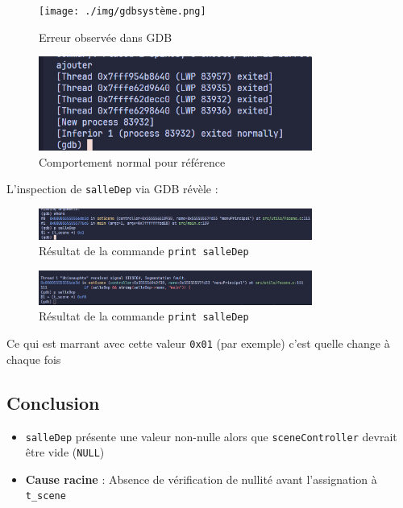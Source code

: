 \documentclass[a4paper,11pt]{article}
\begin{document}
\begin{figure}[h]
    \centering
    \texttt{[image: ./img/gdbsystème.png]}
    \caption{Erreur observée dans GDB}
    \label{fig:gdb_error}
\end{figure}

\begin{figure}[h]
    \centering
    \includegraphics[width=0.8\textwidth]{./img/ExempleMarcheBien.png}
    \caption{Comportement normal pour référence}
    \label{fig:working_example}
\end{figure}

L'inspection de \texttt{salleDep} via GDB révèle :

\begin{figure}[h]
    \centering
    \includegraphics[width=0.8\textwidth]{./img/ErreurAvecPrint.png}
    \caption{Résultat de la commande \texttt{print salleDep}}
    \label{fig:gdb_print}
\end{figure}

\begin{figure}[h]
  \centering
  \includegraphics[width=0.8\textwidth]{./img/Erreur2.png}
  \caption{Résultat de la commande \texttt{print salleDep}}
  \label{fig:gdb_print2}
\end{figure}

Ce qui est marrant avec cette valeur \texttt{0x01} (par exemple) c'est quelle change à chaque fois

\subsection*{Conclusion}
\begin{itemize}
    \item \texttt{salleDep} présente une valeur non-nulle alors que \texttt{sceneController} devrait être vide (\texttt{NULL})
    \item \textbf{Cause racine} : Absence de vérification de nullité avant l'assignation à \texttt{t\_scene}
\end{itemize}
\end{document}
